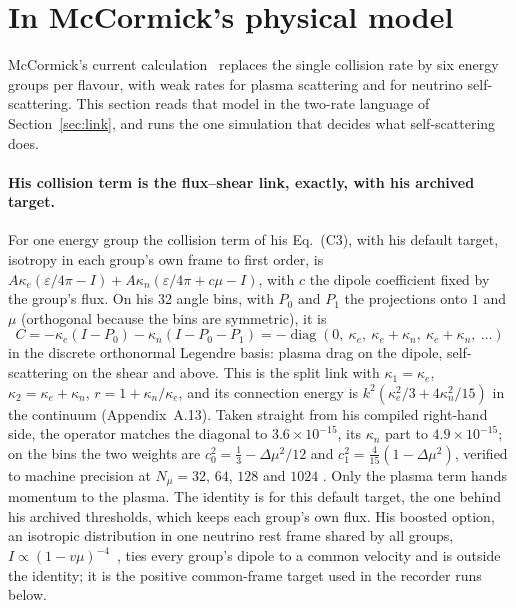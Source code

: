 \section{In McCormick's physical model}\label{sec:mcc}

McCormick's current calculation~\cite{McC2} replaces the single collision rate by six energy groups per flavour, with weak rates for plasma scattering and for neutrino self-scattering. This section reads that model in the two-rate language of Section~\ref{sec:link}, and runs the one simulation that decides what self-scattering does.

\paragraph{His collision term is the flux--shear link, exactly, with his archived target.} For one energy group the collision term of his Eq.~(C3), with his default target, isotropy in each group's own frame to first order, is $A\kappa_e(\varepsilon/4\pi-I)+A\kappa_n(\varepsilon/4\pi+c\mu-I)$, with $c$ the dipole coefficient fixed by the group's flux. On his 32 angle bins, with $P_0$ and $P_1$ the projections onto $1$ and $\mu$ (orthogonal because the bins are symmetric), it is
\begin{equation}
C=-\kappa_e(I-P_0)-\kappa_n(I-P_0-P_1)=-\operatorname{diag}(0,\ \kappa_e,\ \kappa_e+\kappa_n,\ \kappa_e+\kappa_n,\ \dots)
\end{equation}
in the discrete orthonormal Legendre basis: plasma drag on the dipole, self-scattering on the shear and above. This is the split link with $\kappa_1=\kappa_e$, $\kappa_2=\kappa_e+\kappa_n$, $r=1+\kappa_n/\kappa_e$, and its connection energy is $k^2(\kappa_e^2/3+4\kappa_n^2/15)$ in the continuum (Appendix~A.13). Taken straight from his compiled right-hand side, the operator matches the diagonal to $3.6\times10^{-15}$, its $\kappa_n$ part to $4.9\times10^{-15}$; on the bins the two weights are $c_0^2=\tfrac13-\Delta\mu^2/12$ and $c_1^2=\tfrac4{15}(1-\Delta\mu^2)$, verified to machine precision at $N_\mu=32$, $64$, $128$ and $1024$ . Only the plasma term hands momentum to the plasma. The identity is for this default target, the one behind his archived thresholds, which keeps each group's own flux. His boosted option, an isotropic distribution in one neutrino rest frame shared by all groups, $I\propto(1-v\mu)^{-4}$~\cite{McCcode}, ties every group's dipole to a common velocity and is outside the identity; it is the positive common-frame target used in the recorder runs below.

